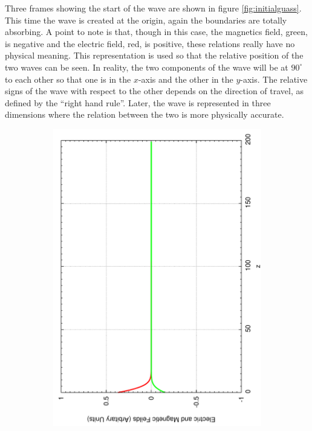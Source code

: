 Three frames showing the start of the wave are shown in figure \ref{fig:initialguass}. This time the wave is created at the origin, again the boundaries are totally absorbing. A point to note is that, though in this case, the magnetics field, green, is negative and the electric field, red, is positive, these relations really have no physical meaning. This representation is used so that the relative position of the two waves can be seen. In reality, the two components of the wave will be at $90^{\circ}$ to each other so that one is in the $x$-axis and the other in the $y$-axis. The relative signs of the wave with respect to the other depends on the direction of travel, as defined by the ``right hand rule''. Later, the wave is represented in three dimensions where the relation between the two is more physically accurate.
\begin{figure}[ht]
        \centering
        \begin{subfigure}[ht]{0.45\textwidth}
                \centering
                \includegraphics[angle=270, width=\textwidth]{initialguass1.pdf}

\end{subfigure}
\end{figure}
